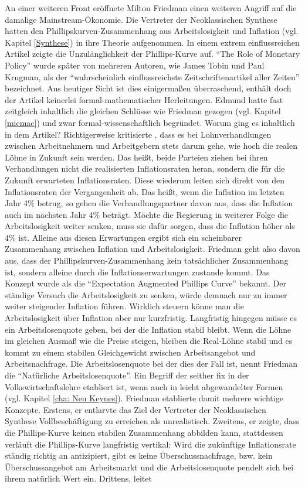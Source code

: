 An einer weiteren Front eröffnete Milton Friedman einen weiteren Angriff auf die damalige Mainstream-Ökonomie. Die Vertreter der Neoklassischen Synthese hatten den Phillipskurven-Zusammenhang aus Arbeitslosigkeit und Inflation (vgl. Kapitel \ref{Synthese}) in ihre Theorie aufgenommen. In einem extrem einflussreichen Artikel zeigte \textcite{Friedman1968} die Unzulänglichkeit der Phillips-Kurve auf. "`The Role of Monetary Policy"' wurde später von mehreren Autoren, wie James Tobin und Paul Krugman,  als der "`wahrscheinlich einflussreichste Zeitschriftenartikel aller Zeiten"' \parencite[S. 160]{Snowdon2005} bezeichnet. Aus heutiger Sicht ist dies einigermaßen überraschend, enthält doch der Artikel keinerlei formal-mathematischer Herleitungen. Edmund \textcite{Phelps1967} hatte fast zeitgleich inhaltlich die gleichen Schlüsse wie Friedman gezogen (vgl. Kapitel \ref{micmac}) und zwar formal-wissenschaftlich begründet. Worum ging es inhaltlich in dem Artikel? Richtigerweise kritisierte \textcite{Friedman1968}, dass es bei Lohnverhandlungen zwischen Arbeitnehmern und Arbeitgebern stets darum gehe, wie hoch die realen Löhne in Zukunft sein werden. Das heißt, beide Parteien ziehen bei ihren Verhandlungen nicht die realisierten Inflationsraten heran, sondern die für die Zukunft erwarteten Inflationsraten. Diese wiederum leiten sich direkt von den Inflationsraten der Vergangenheit ab. Das heißt, wenn die Inflation im letzten Jahr 4\% betrug, so gehen die Verhandlungspartner davon aus, dass die Inflation auch im nächsten Jahr 4\% beträgt. Möchte die Regierung in weiterer Folge die Arbeitslosigkeit weiter senken, muss sie dafür sorgen, dass die Inflation höher als 4\% ist. Alleine aus diesen Erwartungen ergibt sich ein scheinbarer Zusammenhang zwischen Inflation und Arbeitslosigkeit. Friedman geht also davon aus, dass der Phillipskurven-Zusammenhang kein tatsächlicher Zusammenhang ist, sondern alleine durch die Inflationserwartungen zustande kommt. Das Konzept wurde als die "`Expectation Augmented Phillips Curve"' bekannt. Der ständige Versuch die Arbeitslosigkeit zu senken, würde demnach nur zu immer weiter steigender Inflation führen. Wirklich steuern könne man die Arbeitslosigkeit über Inflation aber nur kurzfristig. Langfristig hingegen müsse es ein Arbeitslosenquote geben, bei der die Inflation stabil bleibt. Wenn die Löhne im gleichen Ausmaß wie die Preise steigen, bleiben die Real-Löhne stabil und es kommt zu einem stabilen Gleichgewicht zwischen Arbeitsangebot und Arbeitsnachfrage. Die Arbeitslosenquote bei der dies der Fall ist, nennt Friedman die "`Natürliche Arbeitslosenquote"'. Ein Begriff der seither fix in der Volkswirtschaftslehre etabliert ist, wenn auch in leicht abgewandelter Formen (vgl. Kapitel \ref{cha: Neu Keynes}). Friedman etablierte damit mehrere wichtige Konzepte. Erstens, er entlarvte das Ziel der Vertreter der Neoklassischen Synthese Vollbeschäftigung zu erreichen als unrealistisch. Zweitens, er zeigte, dass die Phillips-Kurve keinen stabilen Zusammenhang abbilden kann, stattdessen verläuft die Phillips-Kurve langfristig vertikal: Wird die zukünftige Inflationsrate ständig richtig an antizipiert, gibt es keine Überschussnachfrage, bzw. kein Überschussangebot am Arbeitsmarkt und die Arbeitslosenquote pendelt sich bei ihrem natürlich Wert ein. Drittens, leitet 